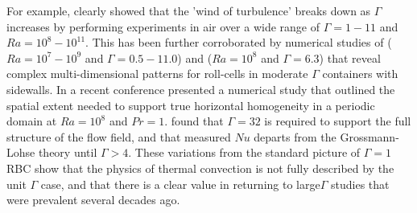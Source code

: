 \documentclass[11pt]{article}
\begin{document}
For example, \cite{dupuits2007breakdown} clearly showed that the 'wind of turbulence' breaks down as $\Gamma$ increases by performing experiments in air over a wide range of $\Gamma=1-11$ and $Ra=10^8-10^11$.
This has been further corroborated by numerical studies of \cite{bailon2010aspect} ($Ra=10^7-10^9$ and $\Gamma=0.5-11.0$)  and \cite{sakievich2016large} ($Ra=10^8$ and $\Gamma=6.3$) that reveal complex multi-dimensional patterns for roll-cells in moderate $\Gamma$ containers with sidewalls.  
In a recent conference \cite{stevens2016superstructures} presented a numerical study that outlined the spatial extent needed to support true horizontal homogeneity in a periodic domain at $Ra=10^8$ and $Pr=1$.  
\cite{stevens2016superstructures} found that $\Gamma=32$ is required to support the full structure of the flow field, and that measured $Nu$ departs from the Grossmann-Lohse theory until $\Gamma>4$.  
These variations from the standard picture of $\Gamma=1$ RBC show that the physics of thermal convection is not fully described by the unit $\Gamma$ case, and that there is a clear value in returning to large$\Gamma$ studies that were prevalent several decades ago.




\end{document}
